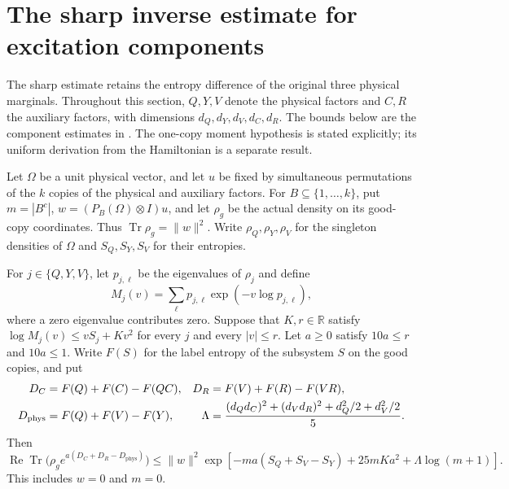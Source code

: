 \section{The sharp inverse estimate for excitation components}

The sharp estimate retains the entropy difference of the original
three physical marginals. Throughout this section, $Q,Y,V$ denote the
physical factors and $C,R$ the auxiliary factors, with dimensions
$d_Q,d_Y,d_V,d_C,d_R$. The bounds below are the component estimates in
\cite[Section~8]{OpenAI2026AreaLaw}. The one-copy moment hypothesis is
stated explicitly; its uniform derivation from the Hamiltonian is a
separate result.

\begin{theorem}
  \label{thm:actual_good_configuration_sharp_moment}
  \leanok
  Let $\Omega$ be a unit physical vector, and let $u$ be fixed by
  simultaneous permutations of the $k$ copies of the physical and
  auxiliary factors. For $B\subseteq\{1,\ldots,k\}$, put $m=|B^c|$,
  $w=(P_B(\Omega)\otimes I)u$, and let $\rho_g$ be the actual density
  on its good-copy coordinates. Thus $\operatorname{Tr}\rho_g=\|w\|^2$.
  Write $\rho_Q,\rho_Y,\rho_V$ for the singleton densities of $\Omega$
  and $S_Q,S_Y,S_V$ for their entropies.

  For $j\in\{Q,Y,V\}$, let $p_{j,\ell}$ be the eigenvalues of $\rho_j$
  and define
  \[
    M_j(v)=\sum_\ell p_{j,\ell}\exp(-v\log p_{j,\ell}),
  \]
  where a zero eigenvalue contributes zero.
  Suppose that $K,r\in\mathbb R$ satisfy
  $\log M_j(v)\leq vS_j+Kv^2$ for every $j$ and every $|v|\leq r$.
  Let $a\geq0$ satisfy $10a\leq r$ and $10a\leq1$.
  Write $F(S)$ for the label entropy of the subsystem $S$ on the good
  copies, and put
  \begin{align}
    D_C&=F(Q)+F(C)-F(QC),&
    D_R&=F(V)+F(R)-F(VR),\notag\\
    D_{\mathrm{phys}}&=F(Q)+F(V)-F(Y),&
    \Lambda&=\frac{(d_Qd_C)^2+(d_Vd_R)^2+d_Q^2/2+d_V^2/2}{5}.
  \end{align}
  Then
  \[
    \operatorname{Re}\operatorname{Tr}
      \bigl(\rho_g e^{a(D_C+D_R-D_{\mathrm{phys}})}\bigr)
    \leq \|w\|^2
      \exp\!\left[-ma(S_Q+S_V-S_Y)+25mKa^2
        +\Lambda\log(m+1)\right].
  \]
  This includes $w=0$ and $m=0$.
\end{theorem}

